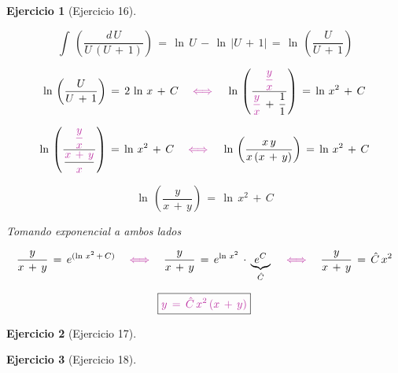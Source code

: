 \documentclass[a4paper,11pt]{book}
\newtheorem{ejer}{Ejercicio}[section]
\begin{document}
\begin{ejer}[Ejercicio 16]
\begin{tcolorbox}[colback=red!5!white,colframe=red!75!black,fonttitle=\bfseries,title=$I_{1}$]
$$\displaystyle\,\int\,\left(\dfrac{d\,U}{U\,(U\,+\,1)} \right)\,=\,\ln\,U\,-\,\ln\,|U\,+\,1|\,=\,\boxed{\ln\,\left(\dfrac{U}{U\,+\,1} \right)}$$ 

  

\end{tcolorbox}  

  

 $$\ln\,\left(\dfrac{U}{U\,+\,1} \right)\,=\,2\,\ln\,x\,+\,C \quad \textcolor{byzantine}{\iff} \quad \ln\,\left(\dfrac{\textcolor{byzantine}{\dfrac{y}{x}}}{\textcolor{byzantine}{\dfrac{y}{x}}\,+\,\dfrac{1}{1} } \right)\,=\,\ln\,x^{2}\,+\,C$$ 

  

$$\ln\,\left(\dfrac{\textcolor{byzantine}{\dfrac{y}{x}}}{\dfrac{\textcolor{byzantine}{x\,+\,y} }{\textcolor{byzantine}{x}} } \right)\,=\,\ln\,x^{2}\,+\,C \quad \textcolor{byzantine}{\iff} \quad \ln\,\left(\dfrac{x\,y}{x\,(x\,+\,y)} \right)\,=\,\ln\,x^{2}\,+\,C$$ 

  

$$\ln\,\left(\dfrac{y}{x\,+\,y} \right)\,=\,\ln\,x^{2}\,+\,C $$ 

  

Tomando exponencial a ambos lados 

  

 $$\dfrac{y}{x\,+\,y}\,=\,e^{(\ln\,x^{2}\,+\,C)} \quad \textcolor{byzantine}{\iff} \quad \dfrac{y}{x\,+\,y}\,=\,e^{\ln\,x^{2} }\,\cdot\,\underbrace{e^{C}}_{\hat{C}} \quad \textcolor{byzantine}{\iff} \quad \dfrac{y}{x\,+\,y}\,=\,\hat{C}\, x^{2}$$ 

  

$$\boxed{\textcolor{byzantine}{y\,=\,\hat{C}\, x^{2}\,(x\,+\,y) } } $$ 

  



\end{ejer} 

  

\begin{ejer}[Ejercicio 17] 

  

\end{ejer} 

  

\begin{ejer}[Ejercicio 18] 

  

\end{ejer} 

  
\end{document}
